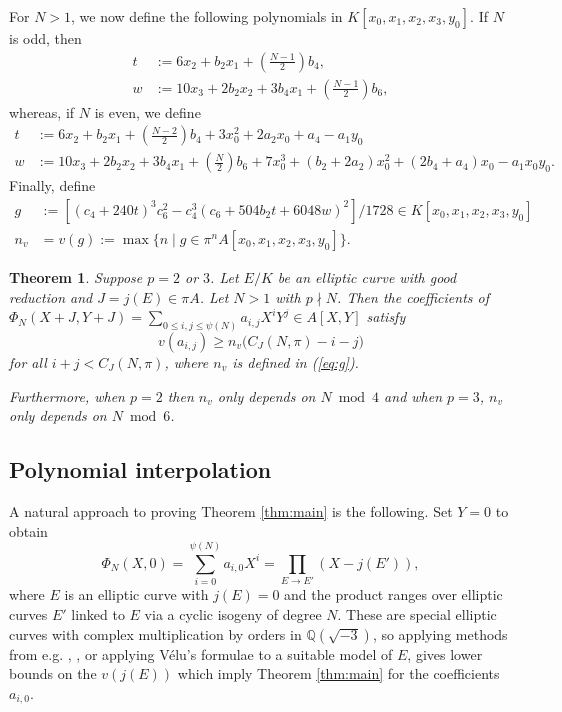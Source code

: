 \documentclass[11pt]{amsart}
\newtheorem{thm}[prop]{Theorem}
\theoremstyle{definition}
\def\BQ{\mathbb{Q}}
\begin{document}
For $N > 1$, we now define the following polynomials in $K[x_0,x_1,x_2,x_3,y_0]$. If $N$ is odd, then
\begin{align}\label{eq:tw_odd}
    t & := 6x_2 + b_2x_1 + \left(\frac{N-1}{2}\right)b_4, \\
    w & := 10x_3 + 2b_2x_2 + 3b_4x_1 + \left(\frac{N-1}{2}\right)b_6, \nonumber
\end{align}
whereas, if $N$ is even, we define
\begin{align}\label{eq:tw_even}
    t & := 6x_2 + b_2x_1 + \left(\frac{N-2}{2}\right)b_4 +
    3x_0^2 + 2a_2x_0 + a_4 - a_1y_0 \\
    w & := 10x_3 + 2b_2x_2 + 3b_4x_1 + \left(\frac{N}{2}\right)b_6
    + 7x_0^3 + (b_2+2a_2)x_0^2 + (2b_4+a_4)x_0 - a_1x_0y_0.\nonumber
\end{align}
Finally, define
\begin{align}\label{eq:g}
g & := [(c_4+240t)^3c_6^2 - c_4^3(c_6 + 504b_2t + 6048w)^2]/1728 \in K[x_0,x_1, x_2,x_3, y_0] \\
n_v & = v(g) := \max \{n \;|\; g \in \pi^nA[x_0,x_1,x_2,x_3,y_0]\}.\nonumber
\end{align}

\begin{thm}\label{thm:smallprimes}
    Suppose $p=2$ or $3$.
    Let $E/K$ be an elliptic curve with good reduction and $J = j(E)\in \pi A$.
    Let $N > 1$ with $p\nmid N$. Then the coefficients of $\Phi_N(X+J, Y+J) = \sum_{0\leq i,j \leq \psi(N)}a_{i,j}X^iY^j\in A[X,Y]$ satisfy
    \[
    v(a_{i,j}) \geq n_v\big(C_J(N,\pi)-i-j\big)
    \]
    for all $i+j < C_J(N,\pi)$, where $n_v$ is defined in (\ref{eq:g}).

    Furthermore, when $p=2$ then $n_v$ only depends on $N \bmod 4$ and when $p=3$, $n_v$ only depends on $N \bmod 6$.
\end{thm}

        

        

        

\subsection{Polynomial interpolation}

A natural approach to proving Theorem \ref{thm:main} is the following. Set $Y=0$ to obtain
\[
\Phi_N(X,0) = \sum_{i=0}^{\psi(N)}a_{i,0}X^i = \prod_{E\to E'}(X - j(E')),
\]
where $E$ is an elliptic curve with $j(E)=0$ and the product ranges over elliptic curves $E'$ linked to $E$ via a cyclic isogeny of degree $N$. These are special elliptic curves with complex multiplication by orders in $\BQ(\sqrt{-3})$, so applying methods from e.g. \cite{Campagna2021}, \cite{GZ1985},  or applying V\'elu's formulae \cite{Velu1971} to a suitable model of $E$, gives lower bounds on the $v(j(E))$ which imply Theorem \ref{thm:main} for the coefficients $a_{i,0}$.
\end{document}
